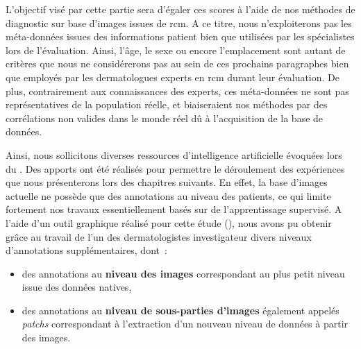 L'objectif visé par cette partie sera d'égaler ces scores à l'aide de nos méthodes de diagnostic sur base d'images issues de \gls{rcm}. A ce titre, nous n'exploiterons pas les méta-données issues des informations patient bien que utilisées par les spécialistes lors de l'évaluation. Ainsi, l'âge, le sexe ou encore l'emplacement sont autant de critères que nous ne considérerons pas au sein de ces prochains paragraphes bien que employés par les dermatologues experts en \gls{rcm} durant leur évaluation. De plus, contrairement aux connaissances des experts, ces méta-données ne sont pas représentatives de la population réelle, et biaiseraient nos méthodes par des corrélations non valides dans le monde réel dû à l'acquisition de la base de données.\par

Ainsi, nous sollicitons diverses ressources d'intelligence artificielle évoquées lors du . Des apports ont été réalisés pour permettre le déroulement des expériences que nous présenterons lors des chapitres suivants. En effet, la base d'images actuelle ne possède que des annotations au niveau des patients, ce qui limite fortement nos travaux essentiellement basés sur de l'apprentissage supervisé. A l'aide d'un outil graphique réalisé pour cette étude (), nous avons pu obtenir grâce au travail de l'un des dermatologistes investigateur divers niveaux d'annotations supplémentaires, dont~:
\begin{itemize}
    \item des annotations au \textbf{niveau des images} correspondant au plus petit niveau issue des données natives,
    \item des annotations au \textbf{niveau de sous-parties d'images} également appelés \textit{patchs} correspondant à l'extraction d'un nouveau niveau de données à partir des images.
\end{itemize}\par
\clearpage

